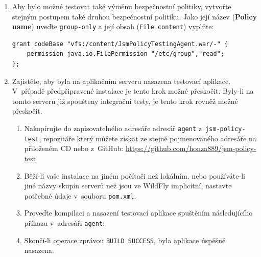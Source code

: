 \begin{enumerate}
  \item Aby bylo možné testovat také výměnu bezpečnostní politiky, vytvořte stejným postupem také druhou bezpečnostní politiku. Jako její název ({\bf Policy name}) uveďte {\tt group-only} a její obsah ({\tt File content}) vyplňte:
  \begin{lstlisting}
grant codeBase "vfs:/content/JsmPolicyTestingAgent.war/-" {
    permission java.io.FilePermission "/etc/group","read";
};
  \end{lstlisting}
  \item Zajistěte, aby byla na aplikačním serveru nasazena testovací aplikace. V~případě předpřipravené instalace je tento krok možné přeskočit. Byly-li na tomto serveru již spoušteny integrační testy, je tento krok rovněž možné přeskočit.
  \begin{enumerate}
    \item Nakopírujte do zapisovatelného adresáře adresář {\tt agent} z~{\tt jsm-policy-test}, repozitáře který můžete získat ze stejně pojmenovaného adresáře na přiloženém CD nebo z~GitHub:
      \newline\url{https://github.com/honza889/jsm-policy-test}
    \item Běží-li vaše instalace na jiném počítači než lokálním, nebo používáte-li jiné názvy skupin serverů než jsou ve WildFly implicitní, nastavte potřebné údaje v~souboru {\tt pom.xml}.
    \item Proveďte kompilaci a nasazení testovací aplikace spuštěním následujícího příkazu v~adresáři {\tt agent}:
    \item Skončí-li operace zprávou {\tt BUILD SUCCESS}, byla aplikace úspěšně nasazena.
  \end{enumerate}
  

\end{enumerate}
